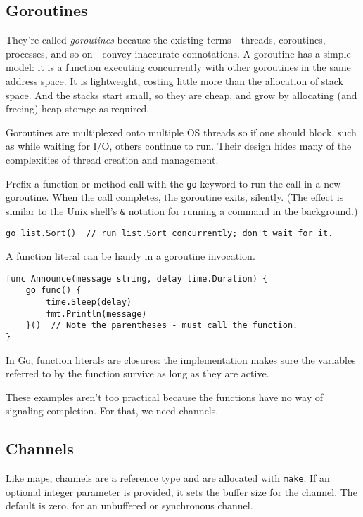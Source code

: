 \subsection*{Goroutines}

They're called \emph{goroutines} because the existing terms---threads,
coroutines, processes, and so on---convey inaccurate connotations. A
goroutine has a simple model: it is a function executing concurrently
with other goroutines in the same address space. It is lightweight,
costing little more than the allocation of stack space. And the stacks
start small, so they are cheap, and grow by allocating (and freeing)
heap storage as required.

Goroutines are multiplexed onto multiple OS threads so if one should
block, such as while waiting for I/O, others continue to run. Their
design hides many of the complexities of thread creation and management.

Prefix a function or method call with the \texttt{go} keyword to run the
call in a new goroutine. When the call completes, the goroutine exits,
silently. (The effect is similar to the Unix shell's \texttt{\&}
notation for running a command in the background.)

\begin{Verbatim}[frame=single]
go list.Sort()  // run list.Sort concurrently; don't wait for it.
\end{Verbatim}

A function literal can be handy in a goroutine invocation.

\begin{Verbatim}[frame=single]
func Announce(message string, delay time.Duration) {
    go func() {
        time.Sleep(delay)
        fmt.Println(message)
    }()  // Note the parentheses - must call the function.
}
\end{Verbatim}

In Go, function literals are closures: the implementation makes sure the
variables referred to by the function survive as long as they are
active.

These examples aren't too practical because the functions have no way of
signaling completion. For that, we need channels.

\subsection*{Channels}

Like maps, channels are a reference type and are allocated with
\texttt{make}. If an optional integer parameter is provided, it sets the
buffer size for the channel. The default is zero, for an unbuffered or
synchronous channel.

